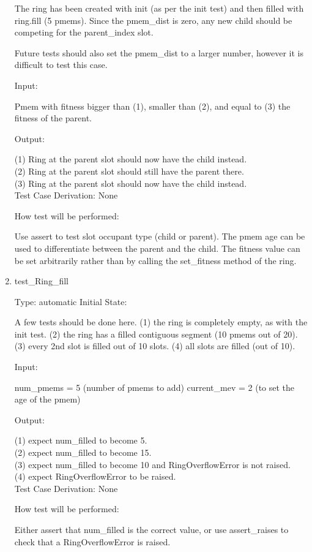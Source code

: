\documentclass[12pt, titlepage]{article}
\begin{document}
\begin{enumerate}
The ring has been created with init (as per the init test) and then filled with 
ring.fill (5 pmems). Since the pmem\_dist is zero, any new child should be 
competing for the parent\_index slot.

Future tests should also set the pmem\_dist to a larger number, however it is 
difficult to test this case.


Input:

Pmem with fitness bigger than (1), smaller than (2), and equal to (3) the 
fitness of the parent.

Output:

(1) Ring at the parent slot should now have the child instead. \\
(2) Ring at the parent slot should still have the parent there. \\
(3) Ring at the parent slot should now have the child instead. \\

Test Case Derivation: None

How test will be performed:

Use assert to test slot occupant type (child or parent). The pmem age can be 
used to differentiate between the parent and the child. The fitness value can 
be set arbitrarily rather than by calling the set\_fitness method of the ring.

\item{test\_Ring\_fill\\}

Type: automatic
Initial State:

A few tests should be done here. (1) the ring is completely empty, as with the 
init test. (2) the ring has a filled contiguous segment (10 pmems out of 20). 
(3) every 2nd slot is filled out of 10 slots. (4) all slots are filled (out of 
10).

Input:

num\_pmems = 5 (number of pmems to add)
current\_mev = 2 (to set the age of the pmem)

Output:

(1) expect num\_filled to become 5.\\
(2) expect num\_filled to become 15.\\
(3) expect num\_filled to become 10 and RingOverflowError is not raised.\\
(4) expect RingOverflowError to be raised.\\

Test Case Derivation: None

How test will be performed:

Either assert that num\_filled is the correct value, or use assert\_raises to 
check that a RingOverflowError is raised.
	
\end{enumerate}
\end{document}

